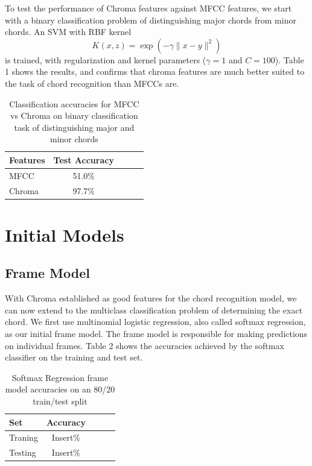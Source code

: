 \documentclass{article}
\begin{document}
To test the performance of Chroma features against MFCC features, we start with a binary classification problem of distinguishing major chords from minor chords. An SVM with RBF kernel $$ K(x, z) = \exp(-\gamma\lVert{x - y}\rVert^2)$$ is trained, with regularization and kernel parameters ($\gamma = 1$ and $C = 100$). Table 1 shows the results, and confirms that chroma features are much better suited to the task of chord recognition than MFCCs are.
\begin{table}[t]
\caption{Classification accuracies for MFCC vs Chroma on binary classification task of distinguishing major and minor chords}
\label{mfccvschroma}
\vskip 0.15in
\begin{center}
\begin{small}
\begin{sc}
\begin{tabular}{lcccr}
\hline
\abovespace\belowspace
Features & Test Accuracy \\
\hline
\abovespace
MFCC    & 51.0\%\\
Chroma & 97.7\%\\
\hline
\end{tabular}
\end{sc}
\end{small}
\end{center}
\vskip -0.1in
\end{table}

\section{Initial Models}
\subsection{Frame Model}
With Chroma established as good features for the chord recognition model, we can now extend to the multiclass classification problem of determining the exact chord. We first use multinomial logistic regression, also called softmax regression, as our initial frame model. The frame model is responsible for making predictions on individual frames. Table 2 shows the accuracies achieved by the softmax classifier on the training and test set.
\begin{table}[t]
\caption{Softmax Regression frame model accuracies on an 80/20 train/test split}
\label{mfccvschroma}
\vskip 0.15in
\begin{center}
\begin{small}
\begin{sc}
\begin{tabular}{lcccr}
\hline
\abovespace\belowspace
Set & Accuracy \\
\hline
\abovespace
Traning    & Insert\%\\
Testing & Insert\%\\
\hline
\end{tabular}
\end{sc}
\end{small}
\end{center}
\vskip -0.1in
\end{table}
\end{document}
